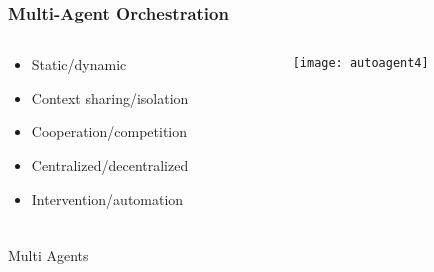 \begin{frame}[fragile]\frametitle{Multi-Agent Orchestration}


\begin{columns}
    \begin{column}[T]{0.6\linewidth}

		  \begin{itemize}
		  \item Static/dynamic
		  \item Context sharing/isolation
		  \item Cooperation/competition
		  \item Centralized/decentralized
		  \item Intervention/automation
		  \end{itemize}

    \end{column}
    \begin{column}[T]{0.4\linewidth}

		\begin{center}
		\texttt{[image: autoagent4]}
		\end{center}
	
    \end{column}
  \end{columns}
  
  

\end{frame}



\begin{frame}[fragile]\frametitle{}
\begin{center}
{\Large Multi Agents}
\end{center}
\end{frame}

